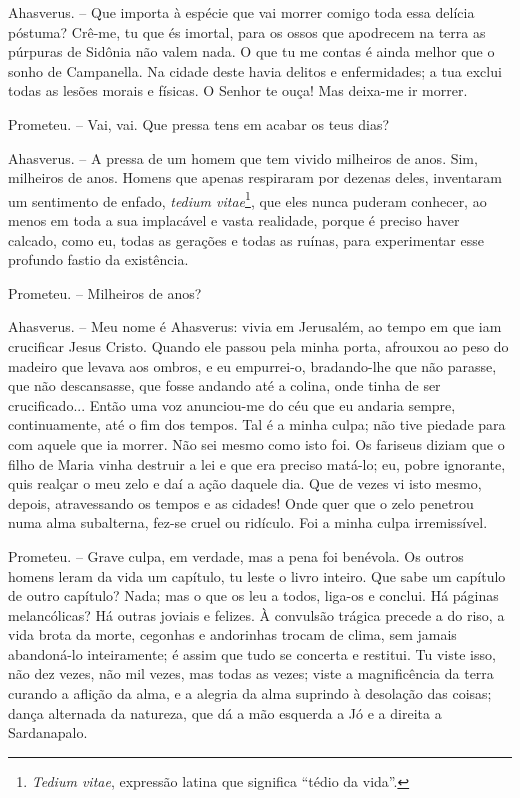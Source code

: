 Ahasverus. -- Que importa à espécie que vai morrer comigo toda essa
delícia póstuma? Crê-me, tu que és imortal, para os ossos que apodrecem
na terra as púrpuras de Sidônia não valem nada. O que tu me contas é
ainda melhor que o sonho de Campanella. Na cidade deste havia delitos e
enfermidades; a tua exclui todas as lesões morais e físicas. O Senhor te
ouça! Mas deixa-me ir morrer.

Prometeu. -- Vai, vai. Que pressa tens em acabar os teus dias?

Ahasverus. -- A pressa de um homem que tem vivido milheiros de anos.
Sim, milheiros de anos. Homens que apenas respiraram por dezenas deles,
inventaram um sentimento de enfado, \emph{tedium vitae}\footnote{\emph{Tedium
  vitae}, expressão latina que significa ``tédio da vida''.}, que eles
nunca puderam conhecer, ao menos em toda a sua implacável e vasta
realidade, porque é preciso haver calcado, como eu, todas as gerações e
todas as ruínas, para experimentar esse profundo fastio da existência.

Prometeu. -- Milheiros de anos?

Ahasverus. -- Meu nome é Ahasverus: vivia em Jerusalém, ao tempo em que
iam crucificar Jesus Cristo. Quando ele passou pela minha porta,
afrouxou ao peso do madeiro que levava aos ombros, e eu empurrei-o,
bradando-lhe que não parasse, que não descansasse, que fosse andando até
a colina, onde tinha de ser crucificado... Então uma voz anunciou-me do
céu que eu andaria sempre, continuamente, até o fim dos tempos. Tal é a
minha culpa; não tive piedade para com aquele que ia morrer. Não sei
mesmo como isto foi. Os fariseus diziam que o filho de Maria vinha
destruir a lei e que era preciso matá-lo; eu, pobre ignorante, quis
realçar o meu zelo e daí a ação daquele dia. Que de vezes vi isto mesmo,
depois, atravessando os tempos e as cidades! Onde quer que o zelo
penetrou numa alma subalterna, fez-se cruel ou ridículo. Foi a minha
culpa irremissível.

Prometeu. -- Grave culpa, em verdade, mas a pena foi benévola. Os outros
homens leram da vida um capítulo, tu leste o livro inteiro. Que sabe um
capítulo de outro capítulo? Nada; mas o que os leu a todos, liga-os e
conclui. Há páginas melancólicas? Há outras joviais e felizes. À
convulsão trágica precede a do riso, a vida brota da morte, cegonhas e
andorinhas trocam de clima, sem jamais abandoná-lo inteiramente; é assim
que tudo se concerta e restitui. Tu viste isso, não dez vezes, não mil
vezes, mas todas as vezes; viste a magnificência da terra curando a
aflição da alma, e a alegria da alma suprindo à desolação das coisas;
dança alternada da natureza, que dá a mão esquerda a Jó e a direita a
Sardanapalo.

